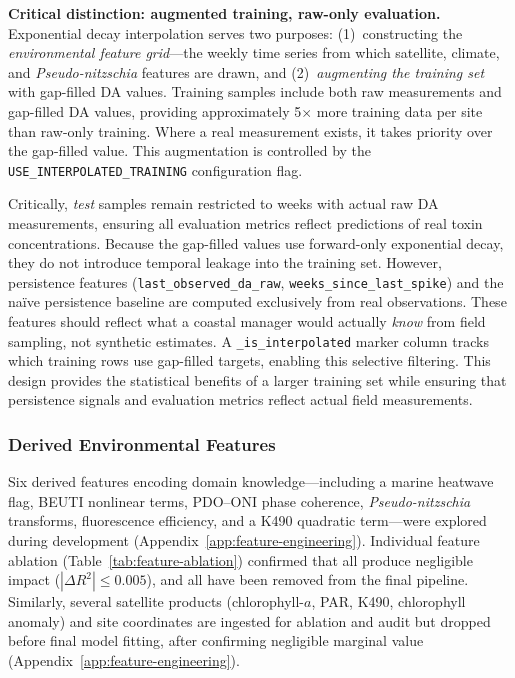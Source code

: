 \documentclass[toxins,article,submit,moreauthors]{Definitions/mdpi}
\begin{document}
\begin{sloppypar}
\textbf{Critical distinction: augmented training, raw-only evaluation.} Exponential decay interpolation serves two purposes: (1)~constructing the \textit{environmental feature grid}---the weekly time series from which satellite, climate, and \textit{Pseudo-nitzschia} features are drawn, and (2)~\textit{augmenting the training set} with gap-filled DA values. Training samples include both raw measurements and gap-filled DA values, providing approximately 5$\times$ more training data per site than raw-only training. Where a real measurement exists, it takes priority over the gap-filled value. This augmentation is controlled by the \texttt{USE\_INTERPOLATED\_TRAINING} configuration flag.

Critically, \textit{test} samples remain restricted to weeks with actual raw DA measurements, ensuring all evaluation metrics reflect predictions of real toxin concentrations. Because the gap-filled values use forward-only exponential decay, they do not introduce temporal leakage into the training set. However, persistence features (\texttt{last\_observed\_da\_raw}, \texttt{weeks\_since\_last\_spike}) and the na\"ive persistence baseline are computed exclusively from real observations. These features should reflect what a coastal manager would actually \textit{know} from field sampling, not synthetic estimates. A \texttt{\_is\_interpolated} marker column tracks which training rows use gap-filled targets, enabling this selective filtering. This design provides the statistical benefits of a larger training set while ensuring that persistence signals and evaluation metrics reflect actual field measurements.
\end{sloppypar}

\subsubsection{Derived Environmental Features}

Six derived features encoding domain knowledge---including a marine heatwave flag, BEUTI nonlinear terms, PDO--ONI phase coherence, \textit{Pseudo-nitzschia} transforms, fluorescence efficiency, and a K490 quadratic term---were explored during development (Appendix~\ref{app:feature-engineering}). Individual feature ablation (Table~\ref{tab:feature-ablation}) confirmed that all produce negligible impact ($|\Delta R^2| \leq 0.005$), and all have been removed from the final pipeline. Similarly, several satellite products (chlorophyll-$a$, PAR, K490, chlorophyll anomaly) and site coordinates are ingested for ablation and audit but dropped before final model fitting, after confirming negligible marginal value (Appendix~\ref{app:feature-engineering}).
\end{document}
